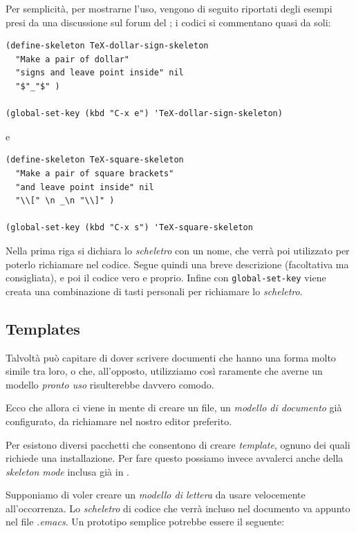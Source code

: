 \documentclass[11pt,a4paper]{article}
\begin{document}
Per semplicità, per mostrarne l'uso, vengono di seguito riportati degli esempi
presi da una discussione sul forum del \guit; i codici si commentano quasi da
soli:
\begin{Verbatim}
(define-skeleton TeX-dollar-sign-skeleton
  "Make a pair of dollar"
  "signs and leave point inside" nil
  "$"_"$" )

(global-set-key (kbd "C-x e") 'TeX-dollar-sign-skeleton)
\end{Verbatim}
e
\begin{Verbatim}
(define-skeleton TeX-square-skeleton
  "Make a pair of square brackets"
  "and leave point inside" nil
  "\\[" \n _\n "\\]" )

(global-set-key (kbd "C-x s") 'TeX-square-skeleton
\end{Verbatim}
Nella prima riga si dichiara lo \emph{scheletro} con un nome, che verrà poi
utilizzato per poterlo richiamare nel codice. Segue quindi una breve descrizione
(facoltativa ma consigliata), e poi il codice vero e proprio. Infine con
\verb!global-set-key! viene creata una combinazione di tasti personali per
richiamare lo \emph{scheletro}.


\subsection{Templates}
\label{sec:skeltempl}

Talvoltà può capitare di dover scrivere documenti che hanno una forma molto
simile tra loro, o che, all'opposto, utilizziamo così raramente che averne un
modello \emph{pronto uso} risulterebbe davvero comodo.

Ecco che allora ci viene in mente di creare un file, un \emph{modello di
  documento} già configurato, da richiamare nel nostro editor preferito.

Per \emacs{} esistono diversi pacchetti che consentono di creare
\emph{template}, ognuno dei quali richiede una installazione. Per fare questo
possiamo invece avvalerci anche della \emph{skeleton mode} inclusa già in
\emacs{}.

Supponiamo di voler creare un \emph{modello di lettera} da usare velocemente
all'occorrenza. Lo \emph{scheletro} di codice che verrà incluso nel documento va
appunto nel file \emph{.emacs}. Un prototipo semplice potrebbe essere il
seguente:
\end{document}
